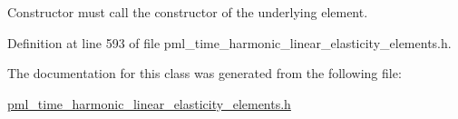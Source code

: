 Constructor must call the constructor of the underlying element. 



Definition at line 593 of file pml\+\_\+time\+\_\+harmonic\+\_\+linear\+\_\+elasticity\+\_\+elements.\+h.



The documentation for this class was generated from the following file\+:\begin{DoxyCompactItemize}
\item 
\hyperlink{pml__time__harmonic__linear__elasticity__elements_8h}{pml\+\_\+time\+\_\+harmonic\+\_\+linear\+\_\+elasticity\+\_\+elements.\+h}\end{DoxyCompactItemize}
